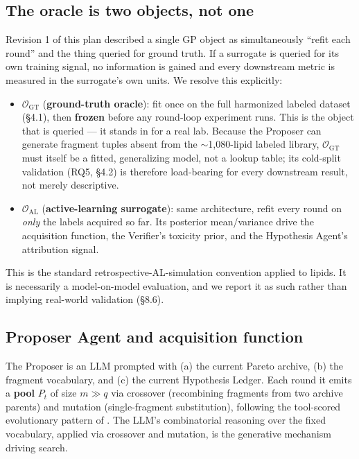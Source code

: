 \documentclass{article}
\begin{document}
\subsection{The oracle is two objects, not one}

Revision 1 of this plan described a single GP object as simultaneously
``refit each round'' and the thing queried for ground truth. If a
surrogate is queried for its own training signal, no information is
gained and every downstream metric is measured in the surrogate's own
units. We resolve this explicitly:

\begin{itemize}
\item $\mathcal{O}_{\text{GT}}$ (\textbf{ground-truth oracle}): fit once on
the full harmonized labeled dataset (\S4.1), then \textbf{frozen} before any
round-loop experiment runs. This is the object that is queried --- it
stands in for a real lab. Because the Proposer can generate fragment
tuples absent from the $\sim$1,080-lipid labeled library,
$\mathcal{O}_{\text{GT}}$ must itself be a fitted, generalizing model, not
a lookup table; its cold-split validation (RQ5, \S4.2) is therefore
load-bearing for every downstream result, not merely descriptive.
\item $\mathcal{O}_{\text{AL}}$ (\textbf{active-learning surrogate}): same
architecture, refit every round on \emph{only} the labels acquired so far.
Its posterior mean/variance drive the acquisition function, the Verifier's
toxicity prior, and the Hypothesis Agent's attribution signal.
\end{itemize}

This is the standard retrospective-AL-simulation convention
\citep{settles2012,gessner2024} applied to lipids. It is necessarily a
model-on-model evaluation, and we report it as such rather than implying
real-world validation (\S8.6).

\subsection{Proposer Agent and acquisition function}

The Proposer is an LLM prompted with (a) the current Pareto archive, (b)
the fragment vocabulary, and (c) the current Hypothesis Ledger. Each round
it emits a \textbf{pool} $P_t$ of size $m \gg q$ via crossover
(recombining fragments from two archive parents) and mutation
(single-fragment substitution), following the tool-scored evolutionary
pattern of \citet{toolmol2026}. The LLM's combinatorial reasoning over the
fixed vocabulary, applied via crossover and mutation, is the generative
mechanism driving search.
\end{document}
